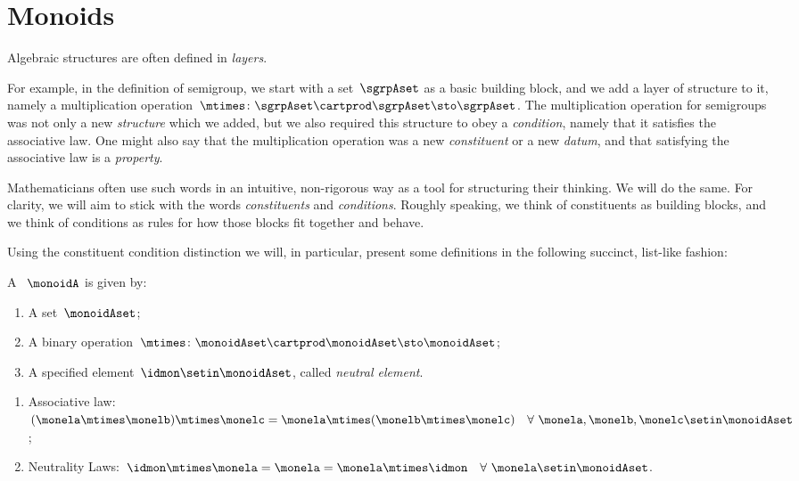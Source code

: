 
\section{Monoids}
\label{sec:parallelism-monoids}

Algebraic structures are often defined in \emph{layers}.

For example, in the definition of semigroup, we start with a set~$\sgrpAset$ as a basic building block, and we add a layer of structure to it, namely a multiplication operation~$\mtimes \colon \sgrpAset \cartprod \sgrpAset \sto \sgrpAset$.
The multiplication operation for semigroups was not only a new \emph{structure} which we added, but we also required this structure to obey a \emph{condition}, namely that it satisfies the associative law.
One might also say that the multiplication operation was a new \emph{constituent} or a new \emph{datum}, and that satisfying the associative law is a \emph{property}.

Mathematicians often use such words in an intuitive, non-rigorous way as a tool for structuring their thinking.
We will do the same.
For clarity, we will aim to stick with the words \emph{constituents} and \emph{conditions}.
Roughly speaking, we think of constituents as building blocks, and we think of conditions as rules for how those blocks fit together and behave.

Using the constituent \vs condition distinction we will, in particular, present some definitions in the following succinct, list-like fashion:

\begin{ctdefinition}[Monoid]
    \label{def:monoid}
    A \emph{}~$\monoidA$  is given by:
    \begin{body}
        \constit
        \begin{enumerate}
            \item A set~$\monoidAset$;
            \item A binary operation~$\mtimes  \colon \monoidAset \cartprod \monoidAset \sto \monoidAset$;
            \item A specified element~$\idmon \setin \monoidAset$, called \emph{neutral element}.
        \end{enumerate}
        \condit
        \begin{enumerate}
            \item Associative law:~$(\monela\mtimes  \monelb)\mtimes  \monelc=
                      \monela\mtimes  (\monelb\mtimes  \monelc) \quad  \forall \  \monela, \monelb, \monelc \setin \monoidAset$;
            \item Neutrality Laws:~$\idmon\mtimes \monela=\monela=\monela\mtimes  \idmon \quad  \forall \ \monela \setin \monoidAset $.
        \end{enumerate}
    \end{body}
\end{ctdefinition}

